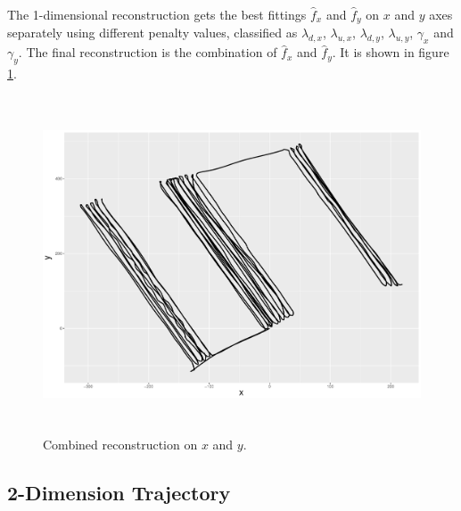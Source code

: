 The 1-dimensional reconstruction gets the best fittings $\hat{f}_x$ and $\hat{f}_y$ on $x$ and $y$ axes separately using different penalty values, classified as $\lambda_{d,x}$, $\lambda_{u,x}$, $\lambda_{d,y}$, $\lambda_{u,y}$, $\gamma_x$ and $\gamma_y$. The final reconstruction is the combination of  $\hat{f}_x$ and $\hat{f}_y$. It is shown in figure \ref{1DCombinedXY}. 
\begin{figure}
  \centering
    \includegraphics[width=\textwidth,height=10cm]{Chapters/02TractorSplineTheory/plot/ggplot/ggRealdataCombinedXY.pdf} 
  \caption{Combined reconstruction on $x$ and $y$.}\label{1DCombinedXY}
\end{figure}



\subsection{2-Dimension Trajectory}


